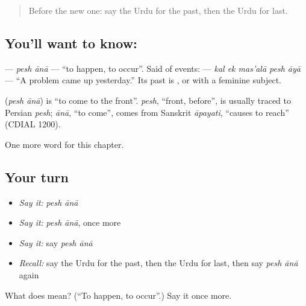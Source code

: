 \begin{quote}
Before the new one: say the Urdu for the past, then the Urdu for last.
\end{quote}

\subsection*{You'll want to know:  }
\textbf{ } — \emph{pesh ānā} — \textquotedblleft{}to happen, to occur\textquotedblright{}. Said of events: \textbf{    } — \emph{kal ek mas'alā pesh āyā} — \textquotedblleft{}A problem came up yesterday.\textquotedblright{} Its past is \textbf{ }, or \textbf{ } with a feminine subject.

\begin{cousinweb}
\textbf{ } (\emph{pesh ānā}) is \textquotedblleft{}to come to the front\textquotedblright{}. \emph{pesh}, \textquotedblleft{}front, before\textquotedblright{}, is usually traced to Persian \emph{pesh}; \emph{ānā}, \textquotedblleft{}to come\textquotedblright{}, comes from Sanskrit \emph{āpayati}, \textquotedblleft{}causes to reach\textquotedblright{} (CDIAL 1200).
\end{cousinweb}

\begin{grammarlens}[title={What you've built}]
One more word for this chapter.
\end{grammarlens}

\subsection*{Your turn}
\begin{itemize}
\raggedright
  \item \emph{Say it:} \emph{pesh ānā}
  \item \emph{Say it:} \emph{pesh ānā}, once more
  \item \emph{Say it:} say \emph{pesh ānā}
  \item \emph{Recall:} say the Urdu for the past, then the Urdu for last, then say \emph{pesh ānā} again
\end{itemize}

\begin{tcolorbox}[breakable,colback=teal!4,colframe=teal!35!black,title={Before you move on}]
What does   mean? (\textquotedblleft{}To happen, to occur\textquotedblright{}.) Say it once more.
\end{tcolorbox}
